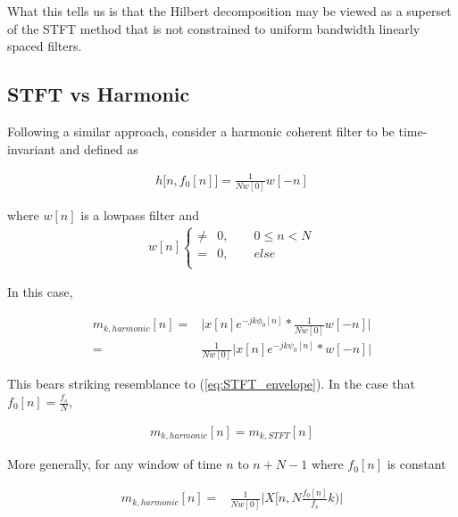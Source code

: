 \documentclass [11pt, proquest,oneside] {ganter_thesis}[2015/03/03]
\begin{document}
What this tells us is that the Hilbert decomposition may be viewed as a superset of the STFT method that is not constrained to uniform bandwidth linearly spaced filters.

\subsection{STFT vs Harmonic}\label{ss:stft_vs_harmonic}

Following a similar approach, consider a harmonic coherent filter to be time-invariant and defined as

\begin{align}
h\big[n, f_0[n] \big] = \frac{1}{Nw[0]} w[-n]
\end{align}

where $w[n]$ is a lowpass filter and 
\begin{align}
w[n] \left\{
                \begin{array}{ll}
                \neq& 0, \qquad 0 \leq n < N \nonumber \\
			   =& 0, \qquad else \\
                \end{array}
              \right.
\end{align}

In this case,

\begin{align}
m_{k,harmonic}[n] =& \Big| x[n] e^{-jk\phi_0 [n]} *  \frac{1}{Nw[0]} w[-n] \Big|  \nonumber \\
\label{eq:m_k_harmonic_with_stft_filter}
=& \frac{1}{Nw[0]} \Big| x[n] e^{-jk\psi_0 [n]} *  w[-n] \Big|
\end{align}

This bears striking resemblance to (\ref{eq:STFT_envelope}).  In the case that $f_0[n] = \frac{f_s}{N}$,

\begin{align}
m_{k,harmonic}[n] = m_{k,STFT}[n]
\end{align}

More generally, for any window of time $n$ to $n + N - 1$ where $f_0[n]$ is constant

\begin{align}
%
%
%
\label{eq:harmonic-to-stft_relate}
m_{k,harmonic}[n] =& \frac{1}{Nw[0]} \Big| X[n, N \frac{f_0[n]}{f_s} k) \Big|
\end{align}
\end{document}
